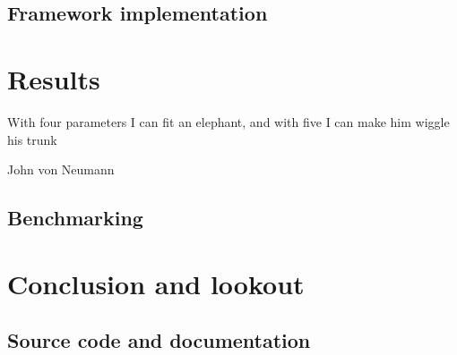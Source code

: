 \documentclass{book}
\begin{document}
\section{Framework implementation} \label{sec:framework_impl}


\chapter{Results} \label{chap:results}

\epigraph{With four parameters I can fit an elephant, and with five I can make him wiggle his trunk}{John von Neumann}

\section{Benchmarking}


\chapter{Conclusion and lookout}

\begin{appendices}
    \chapter{Source code and documentation}
\end{appendices}



\end{document}
